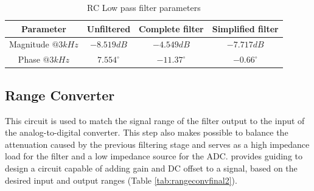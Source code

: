 \documentclass[conference]{IEEEtran}
\begin{document}
\begin{table}[h!]
\centering
\caption{RC Low pass filter parameters}
\label{tab:rcfilterwol}
\begin{tabular}{|c|c|c|c|}
\hline
Parameter & Unfiltered & Complete filter & Simplified filter \\ \hline
Magnitude $@3kHz$ & $-8.519dB$ & $-4.549dB$ & $-7.717dB$ \\ \hline
Phase $@3kHz$ & $7.554^{\circ}$ & $-11.37^{\circ}$ & $-0.66^{\circ}$ \\ \hline
\end{tabular}
\end{table}	

\subsection{Range Converter}

This circuit is used to match the signal range of the filter output to the input of the analog-to-digital converter. This step also makes possible to balance the attenuation caused by the previous filtering stage and serves as a high impedance load for the filter and a low impedance source for the ADC. \cite{sloa097} provides guiding to design a circuit capable of adding gain and DC offset to a signal, based on the desired input and output ranges (Table \ref{tab:rangeconvfinal2}).


\end{document}
